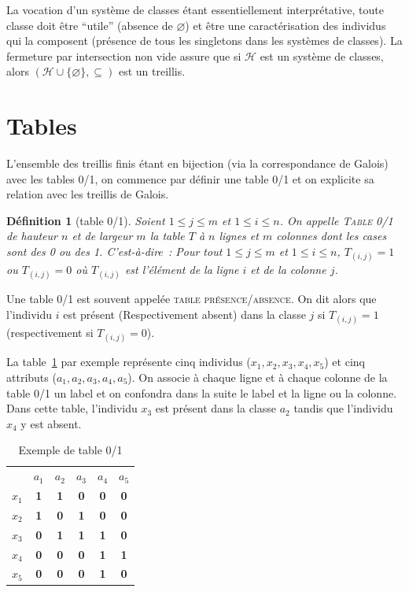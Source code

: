 \documentclass[a4paper]{report}
\renewcommand{\textbf}[1]{\begingroup\bfseries\mathversion{bold}#1\endgroup}
\newtheorem{definition}{Définition}[chapter]
\begin{document}
La vocation d'un système de classes étant essentiellement interprétative, toute classe doit \^etre ``utile'' (absence de $\varnothing$)
et \^etre une caractérisation des individus qui la composent (présence de tous les singletons dans les systèmes de classes).
La fermeture par intersection non vide assure que si $\mathcal{H}$ est un système de classes, alors $(\mathcal{H} \cup \{\varnothing\}, \subseteq)$ est un treillis.

\section{Tables}

L'ensemble des treillis finis étant en bijection (via la correspondance de Galois) avec les tables 0/1, 
 on commence par définir une table 0/1 et on explicite sa relation avec les treillis de Galois.

\begin{definition}[table 0/1]

Soient $1 \leq j \leq m$ et $1 \leq i \leq n$. On appelle \textsc{Table 0/1} de hauteur $n$ et de largeur $m$ la table $T$ à $n$ lignes et $m$ colonnes dont les 
cases sont des 0 ou des 1.
 C'est-à-dire~:
Pour tout $1 \leq j \leq m$ et $1 \leq i \leq n$, $T_{(i, j)} = 1$ ou $T_{(i, j)} = 0$ 
 où $T_{(i, j)}$ est l'élément de la ligne $i$ et de la colonne $j$.
\end{definition}


Une table 0/1 est souvent appelée \textsc{table présence/absence}. On dit alors que l'individu $i$ est présent 
(Respectivement absent) dans la classe $j$ si $T_{(i, j)} = 1$ (respectivement si $T_{(i, j)} = 0$).

La table~\ref{ex_tab_0_1} par exemple représente cinq individus ($x_1, x_2, x_3, x_4, x_5$) et cinq attributs ($a_1, a_2, a_3, a_4, a_5$).
On associe à chaque ligne et à chaque colonne de la table 0/1 un label et on confondra dans la suite le label et la ligne ou la colonne.
Dans cette table, l'individu $x_3$ est présent dans la classe $a_2$ tandis que l'individu $x_4$ y est absent.


\begin{table}[htb]
  \centering

\begin{tabular}{lccccc}
 & $a_1$ & $a_2$ & $a_3$ & $a_4$ & $a_5$\\
$x_1$ & \textbf{1} & \textbf{1} & \textbf{0} & \textbf{0} & \textbf{0}\\
$x_2$ & \textbf{1} & \textbf{0} & \textbf{1} & \textbf{0} & \textbf{0}\\
$x_3$ & \textbf{0} & \textbf{1} & \textbf{1} & \textbf{1} & \textbf{0}\\
$x_4$ & \textbf{0} & \textbf{0} & \textbf{0} & \textbf{1} & \textbf{1}\\
$x_5$ & \textbf{0} & \textbf{0} & \textbf{0} & \textbf{1} & \textbf{0}

\end{tabular}
\caption{Exemple de table 0/1  }
\label{ex_tab_0_1}
\end{table}
\end{document}
